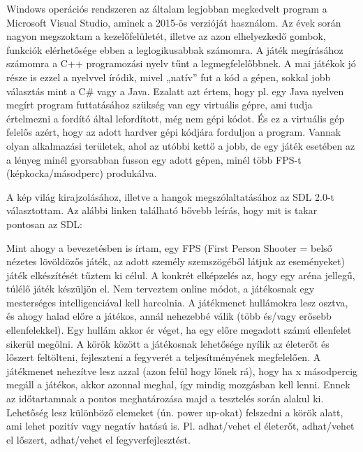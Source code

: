 \label{Chap:komponensek}


Windows operációs rendszeren az általam legjobban megkedvelt program a Microsoft Visual Studio, aminek a 2015-ös verzióját használom. Az évek során nagyon megszoktam a kezelőfelületét, illetve az azon elhelyezkedő gombok, funkciók elérhetősége ebben a leglogikusabbak számomra. A játék megírásához számomra a C++ programozási nyelv tűnt a legmegfelelőbbnek. A mai játékok jó része is ezzel a nyelvvel íródik, mivel „natív” fut a kód a gépen, sokkal jobb választás mint a C\# vagy a Java. Ezalatt azt értem, hogy pl. egy Java nyelven megírt program futtatásához szükség van egy virtuális gépre, ami tudja értelmezni a fordító által lefordított, még nem gépi kódot. És ez a virtuális gép felelős azért, hogy az adott hardver gépi kódjára forduljon a program. Vannak olyan alkalmazási területek, ahol az utóbbi kettő a jobb, de egy játék esetében az a lényeg minél gyorsabban fusson egy adott gépen, minél több FPS-t (képkocka/másodperc) produkálva.

A kép világ kirajzolásához, illetve a hangok megszólaltatásához az SDL 2.0-t választottam. Az alábbi linken található bővebb leírás, hogy mit is takar pontosan az SDL:



Mint ahogy a bevezetésben is írtam, egy FPS (First Person Shooter = belső nézetes lövöldözős játék, az adott személy szemszögéből látjuk az eseményeket) játék elkészítését tűztem ki célul. A konkrét elképzelés az, hogy egy aréna jellegű, túlélő játék készüljön el. Nem terveztem online módot, a játékosnak egy mesterséges intelligenciával kell harcolnia. A játékmenet hullámokra lesz osztva, és ahogy halad előre a játékos, annál nehezebbé válik (több és/vagy erősebb ellenfelekkel). Egy hullám akkor ér véget, ha egy előre megadott számú ellenfelet sikerül megölni. A körök között a játékosnak lehetősége nyílik az életerőt és lőszert feltölteni, fejleszteni a fegyverét a teljesítményének megfelelően. A játékmenet nehezítve lesz azzal (azon felül hogy lőnek rá), hogy ha x másodpercig megáll a játékos, akkor azonnal meghal, így mindig mozgásban kell lenni. Ennek az időtartamnak a pontos meghatározása majd a tesztelés során alakul ki. Lehetőség lesz különböző elemeket (ún. power up-okat) felszedni a körök alatt, ami lehet pozitív vagy negatív hatású is. Pl. adhat/vehet el életerőt, adhat/vehet el lőszert, adhat/vehet el fegyverfejlesztést.

